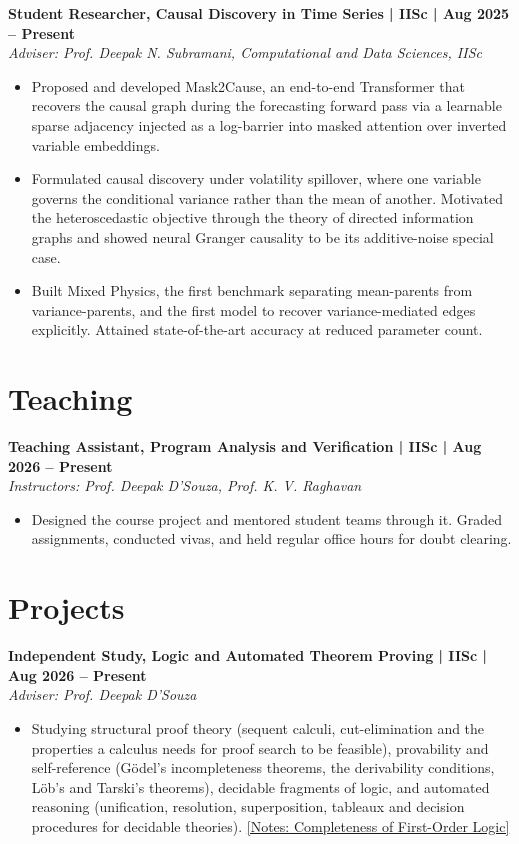 \documentclass[a4paper,10pt]{article}
\newcommand{\role}[4]{
    \noindent \textbf{#1 | #3 | #2} \\
    \textit{#4}
}
\begin{document}
\role{Student Researcher, Causal Discovery in Time Series}{Aug 2025 -- Present}{IISc}{Adviser: Prof. Deepak N. Subramani, Computational and Data Sciences, IISc}
\begin{itemize}
    \item Proposed and developed Mask2Cause, an end-to-end Transformer that recovers the causal graph during the forecasting forward pass via a learnable sparse adjacency injected as a log-barrier into masked attention over inverted variable embeddings.
    \item Formulated causal discovery under volatility spillover, where one variable governs the conditional variance rather than the mean of another. Motivated the heteroscedastic objective through the theory of directed information graphs and showed neural Granger causality to be its additive-noise special case.
    \item Built Mixed Physics, the first benchmark separating mean-parents from variance-parents, and the first model to recover variance-mediated edges explicitly. Attained state-of-the-art accuracy at reduced parameter count.
\end{itemize}

\section*{Teaching}
\role{Teaching Assistant, Program Analysis and Verification}{Aug 2026 -- Present}{IISc}{Instructors: Prof. Deepak D'Souza, Prof. K. V. Raghavan}
\begin{itemize}
    \item Designed the course project and mentored student teams through it. Graded assignments, conducted vivas, and held regular office hours for doubt clearing.
\end{itemize}

\section*{Projects}

\role{Independent Study, Logic and Automated Theorem Proving}{Aug 2026 -- Present}{IISc}{Adviser: Prof. Deepak D'Souza}
\begin{itemize}
    \item Studying structural proof theory (sequent calculi, cut-elimination and the properties a calculus needs for proof search to be feasible), provability and self-reference (G\"odel's incompleteness theorems, the derivability conditions, L\"ob's and Tarski's theorems), decidable fragments of logic, and automated reasoning (unification, resolution, superposition, tableaux and decision procedures for decidable theories). \href{https://omar826.github.io/ISP_notes.pdf}{[Notes: Completeness of First-Order Logic]}
\end{itemize}
\vspace{3pt}
\end{document}
